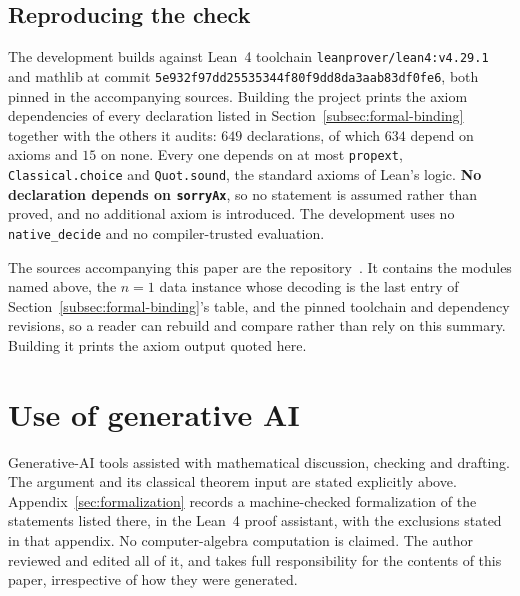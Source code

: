 \documentclass[11pt]{article}
\numberwithin{equation}{section}
\theoremstyle{remark}
\begin{document}
\subsection{Reproducing the check}\label{subsec:formal-repro}

The development builds against Lean~4 toolchain \texttt{leanprover/lean4:v4.29.1}
and mathlib at commit
\texttt{5e932f97dd25535344f80f9dd8da3aab83df0fe6}, both pinned in the
accompanying sources. Building the project prints the axiom dependencies of every
declaration listed in Section~\ref{subsec:formal-binding} together with the
others it audits: $649$ declarations, of which $634$ depend on axioms and
$15$ on none. Every one depends on at most \texttt{propext},
\texttt{Classical.choice} and \texttt{Quot.sound}, the standard axioms of Lean's
logic. \textbf{No declaration depends on \texttt{sorryAx}}, so no statement is
assumed rather than proved, and no additional axiom is introduced. The
development uses no \texttt{native\_decide} and no compiler-trusted evaluation.

The sources accompanying this paper are the repository~\cite{Repo}. It contains
the modules named above, the $n=1$ data instance whose decoding is the last
entry of Section~\ref{subsec:formal-binding}'s table, and the pinned toolchain
and dependency revisions, so a reader can rebuild and compare rather than rely
on this summary.
Building it prints the axiom output quoted here.

\section*{Use of generative AI}
Generative-AI tools assisted with mathematical discussion, checking and drafting.
The argument and its classical theorem input are stated explicitly above.
Appendix~\ref{sec:formalization} records a machine-checked formalization of the
statements listed there, in the Lean~4 proof assistant, with the exclusions
stated in that appendix. No computer-algebra computation is claimed.
The author reviewed and edited all of it, and takes full responsibility for the
contents of this paper, irrespective of how they were generated.
\end{document}
